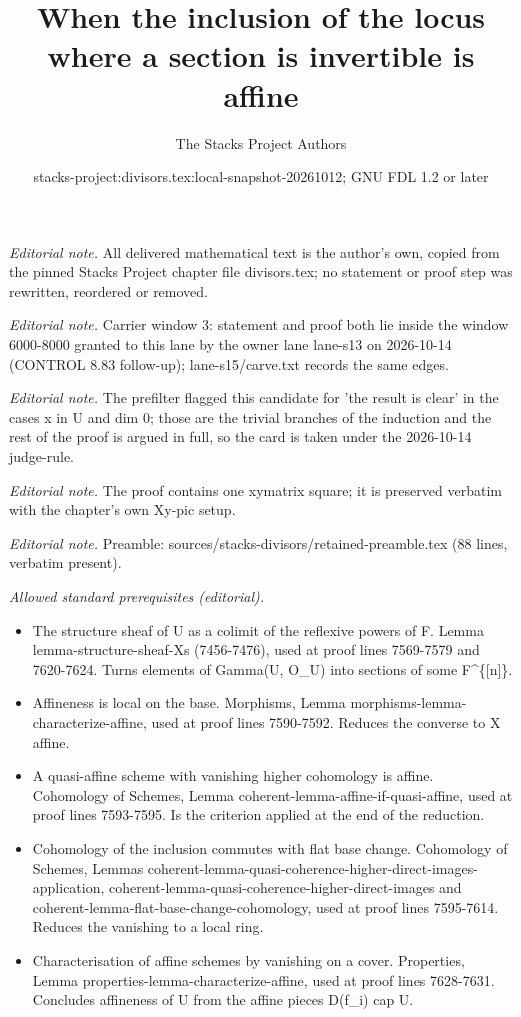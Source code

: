 \documentclass[10pt,a4paper]{amsart}
\title{When the inclusion of the locus where a section is invertible is affine}
\author{The Stacks Project Authors}
\date{stacks-project:divisors.tex:local-snapshot-20261012; GNU FDL 1.2 or later}
\theoremstyle{plain}
\theoremstyle{definition}
\theoremstyle{remark}
\numberwithin{equation}{subsection}
\begin{document}
\maketitle
\setcounter{subsection}{1}
\noindent\textit{Editorial note.} All delivered mathematical text is the author's own, copied from the pinned Stacks Project chapter file divisors.tex; no statement or proof step was rewritten, reordered or removed.\par\medskip
\noindent\textit{Editorial note.} Carrier window 3: statement and proof both lie inside the window 6000-8000 granted to this lane by the owner lane lane-s13 on 2026-10-14 (CONTROL 8.83 follow-up); lane-s15/carve.txt records the same edges.\par\medskip
\noindent\textit{Editorial note.} The prefilter flagged this candidate for 'the result is clear' in the cases x in U and dim 0; those are the trivial branches of the induction and the rest of the proof is argued in full, so the card is taken under the 2026-10-14 judge-rule.\par\medskip
\noindent\textit{Editorial note.} The proof contains one xymatrix square; it is preserved verbatim with the chapter's own Xy-pic setup.\par\medskip
\noindent\textit{Editorial note.} Preamble: sources/stacks-divisors/retained-preamble.tex (88 lines, verbatim present).\par\medskip
\noindent\textit{Allowed standard prerequisites (editorial).}\begin{itemize}
\item The structure sheaf of U as a colimit of the reflexive powers of F. Lemma lemma-structure-sheaf-Xs (7456-7476), used at proof lines 7569-7579 and 7620-7624. Turns elements of Gamma(U, O\_U) into sections of some F\textasciicircum{}\{[n]\}.
\item Affineness is local on the base. Morphisms, Lemma morphisms-lemma-characterize-affine, used at proof lines 7590-7592. Reduces the converse to X affine.
\item A quasi-affine scheme with vanishing higher cohomology is affine. Cohomology of Schemes, Lemma coherent-lemma-affine-if-quasi-affine, used at proof lines 7593-7595. Is the criterion applied at the end of the reduction.
\item Cohomology of the inclusion commutes with flat base change. Cohomology of Schemes, Lemmas coherent-lemma-quasi-coherence-higher-direct-images-application, coherent-lemma-quasi-coherence-higher-direct-images and coherent-lemma-flat-base-change-cohomology, used at proof lines 7595-7614. Reduces the vanishing to a local ring.
\item Characterisation of affine schemes by vanishing on a cover. Properties, Lemma properties-lemma-characterize-affine, used at proof lines 7628-7631. Concludes affineness of U from the affine pieces D(f\_i) cap U.
\end{itemize}\medskip
\end{document}
